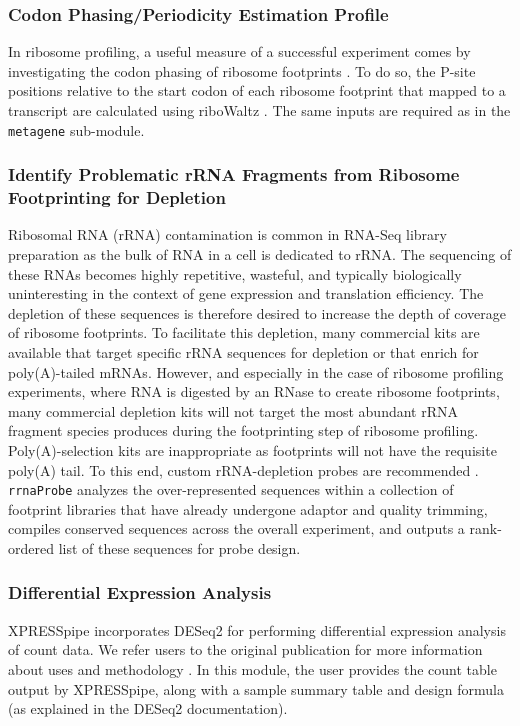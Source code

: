 \documentclass[10pt, oneside]{article}
\begin{document}
\subsubsection{Codon Phasing/Periodicity Estimation Profile}
In ribosome profiling, a useful measure of a successful experiment comes by investigating the codon phasing of ribosome footprints \cite{ingolia_meth}. To do so, the P-site positions relative to the start codon of each ribosome footprint that mapped to a transcript are calculated using riboWaltz \cite{ribowaltz}. The same inputs are required as in the \texttt{metagene} sub-module.

\subsubsection{Identify Problematic rRNA Fragments from Ribosome Footprinting for Depletion}
Ribosomal RNA (rRNA) contamination is common in RNA-Seq library preparation as the bulk of RNA in a cell is dedicated to rRNA. The sequencing of these RNAs becomes highly repetitive, wasteful, and typically biologically uninteresting in the context of gene expression and translation efficiency. The depletion of these sequences is therefore desired to increase the depth of coverage of ribosome footprints. To facilitate this depletion, many commercial kits are available that target specific rRNA sequences for depletion or that enrich for poly(A)-tailed mRNAs. However, and especially in the case of ribosome profiling experiments, where RNA is digested by an RNase to create ribosome footprints, many commercial depletion kits will not target the most abundant rRNA fragment species produces during the footprinting step of ribosome profiling. Poly(A)-selection kits are inappropriate as footprints will not have the requisite poly(A) tail. To this end, custom rRNA-depletion probes are recommended \cite{ingolia_meth, ingolia_science}. \texttt{rrnaProbe} analyzes the over-represented sequences within a collection of footprint libraries that have already undergone adaptor and quality trimming, compiles conserved sequences across the overall experiment, and outputs a rank-ordered list of these sequences for probe design.

\subsubsection{Differential Expression Analysis}
XPRESSpipe incorporates DESeq2 for performing differential expression analysis of count data. We refer users to the original publication for more information about uses and methodology \cite{deseq2}. In this module, the user provides the count table output by XPRESSpipe, along with a sample summary table and design formula (as explained in the DESeq2 documentation).
\end{document}
